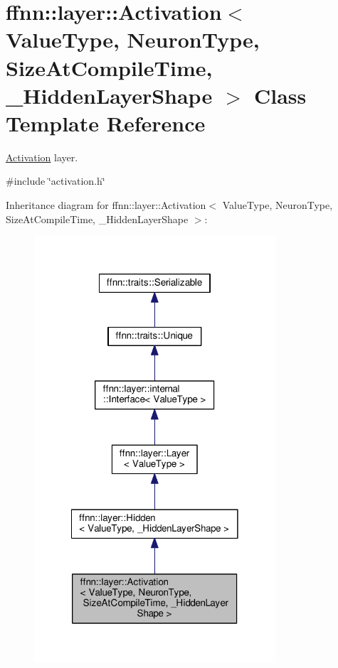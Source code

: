 \hypertarget{classffnn_1_1layer_1_1_activation}{\section{ffnn\-:\-:layer\-:\-:Activation$<$ Value\-Type, Neuron\-Type, Size\-At\-Compile\-Time, \-\_\-\-Hidden\-Layer\-Shape $>$ Class Template Reference}
\label{classffnn_1_1layer_1_1_activation}
}


\hyperlink{classffnn_1_1layer_1_1_activation}{Activation} layer.  




{\ttfamily \#include \char`\"{}activation.\-h\char`\"{}}



Inheritance diagram for ffnn\-:\-:layer\-:\-:Activation$<$ Value\-Type, Neuron\-Type, Size\-At\-Compile\-Time, \-\_\-\-Hidden\-Layer\-Shape $>$\-:
\nopagebreak
\begin{figure}[H]
\begin{center}
\leavevmode
\includegraphics[width=254pt]{classffnn_1_1layer_1_1_activation__inherit__graph}
\end{center}
\end{figure}


